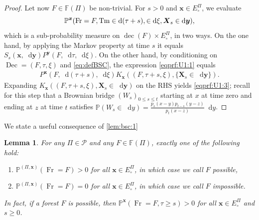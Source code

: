 \documentclass[reqno,draft]{amsart}
\numberwithin{equation}{section}
\theoremstyle{plain}
\newtheorem{lemma}[theorem]{Lemma}
\theoremstyle{remark}
\renewcommand{\P}{\mathbb{P}} %
\newcommand*\diff{\mathop{}\!\mathrm{d}}
\DeclareMathOperator{\pr}{pr}
\newcommand{\fpart}{\Pi} %
\DeclareMathOperator{\dcb}{dec}
\newcommand{\semi}{S}
\DeclareMathOperator{\fr}{Fr}
\DeclareMathOperator{\tm}{Tm}
\let\sp\relax %
\DeclareMathOperator{\sp}{Sp}
\DeclareMathOperator{\dc}{Dec}
\begin{document}
\begin{proof}
    Let now $F \in \mathbb{F}(\fpart)$ be non-trivial. For $s > 0$ and $\boldsymbol x\in E^\fpart_\circ $, we evaluate
    \begin{equation}\label{eqprf:U1:1}
        \P^{\boldsymbol x}(\fr = F, \tm \in \diff (\tau + s), \sp \in \diff \xi, \boldsymbol X_s \in \diff \boldsymbol y),
    \end{equation}
    which is a sub-probability measure on $\dcb(F) \times E^\fpart_\circ $, in two ways. On the one hand, by applying the Markov property at time $s$ it equals $\semi_s(\boldsymbol x,\diff \boldsymbol y) P^{\boldsymbol y}(F,\diff \tau,\diff \xi)$. On the other hand, by conditioning on $\dc = (F,\tau,\xi)$ and \cref{eq:defBSC}, the expression \cref{eqprf:U1:1} equals %
    \begin{align*}%
        P^{\boldsymbol x}(F,\diff (\tau+s),\diff \xi) K_{\boldsymbol x}((F,\tau+s,\xi), \{\boldsymbol X_s \in \diff \boldsymbol y\}) .
    \end{align*}
    Expanding $K_{\boldsymbol x}((F,\tau+s,\xi),\boldsymbol X_s\in \diff \boldsymbol y)$ on the RHS yields \eqref{eqprf:U1:3}; recall for this step that a Brownian bridge $(W_s)_{0\le s\le t}$ starting at $x$ at time zero and ending at $z$ at time $t$ satisfies $\P(W_s \in \diff y) = \frac{p_s(x-y) p_{t-s}(y-z)}{p_t(x-z)} \diff y$.
\end{proof}

We state a useful consequence of \cref{lem:bsc:1}
\begin{lemma}\label{lem:forestpossible}
     For any $\fpart \in \mathcal{P}$ and any $F\in \mathbb{F}(\fpart)$, exactly one of the following hold:
    \begin{enumerate}
        \item $\P^{(\fpart,\boldsymbol x)}(\fr = F) > 0$ for all $\boldsymbol x\in E^\fpart_\circ $, in which case we call $F$ \emph{possible},
        \item $\P^{(\fpart,\boldsymbol x)}(\fr = F) = 0$ for all $\boldsymbol x\in E^\fpart_\circ $, in which case we call $F$ \emph{impossible}.
    \end{enumerate}   
    In fact, if a forest $F$ is possible, then $\P^{\boldsymbol x}(\fr = F, \tau \ge s) > 0$ for all $\boldsymbol x\in E^\fpart_\circ $ and $s \ge 0$.
\end{lemma}
\end{document}
